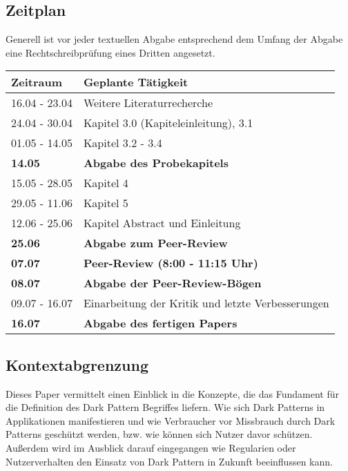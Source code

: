 \documentclass[conference,compsoc,final,a4paper]{IEEEtran}
\begin{document}
\subsection{Zeitplan}
Generell ist vor jeder textuellen Abgabe entsprechend dem Umfang der Abgabe eine Rechtschreibprüfung eines Dritten angesetzt.
\begin{table}[H]
\begin{tabular*}{\linewidth}{ @{\extracolsep{\fill}}l  l}
    \toprule
\textbf{Zeitraum}                   & \textbf{Geplante Tätigkeit}       \\
    \midrule
16.04 - 23.04                       & Weitere Literaturrecherche        \\
24.04 - 30.04                       & Kapitel 3.0 (Kapiteleinleitung), 3.1                          \\
01.05 - 14.05                       & Kapitel 3.2 - 3.4                          \\
\textbf{14.05}                      & \textbf{Abgabe des Probekapitels} \\
15.05 - 28.05                       & Kapitel 4                           \\
29.05 - 11.06                       & Kapitel 5                          \\
12.06 - 25.06                       & Kapitel Abstract und Einleitung                          \\
\textbf{25.06}                      & \textbf{Abgabe zum Peer-Review}   \\
\textbf{07.07}                      & \textbf{Peer-Review (8:00 - 11:15 Uhr)} \\
\textbf{08.07}                      & \textbf{Abgabe der Peer-Review-Bögen}   \\
09.07 - 16.07                       & Einarbeitung der Kritik und letzte Verbesserungen                           \\
\textbf{16.07}                      & \textbf{Abgabe des fertigen Papers}      \\
    \bottomrule
\end{tabular*}
\end{table}

\subsection{Kontextabgrenzung}
Dieses Paper vermittelt einen Einblick in die Konzepte, die das Fundament für die Definition des Dark Pattern Begriffes liefern. Wie sich Dark Patterns in Applikationen manifestieren und wie Verbraucher vor Missbrauch durch Dark Patterns geschützt werden, bzw. wie können sich Nutzer davor schützen. Außerdem wird im Ausblick darauf eingegangen wie Regularien oder Nutzerverhalten den Einsatz von Dark Pattern in Zukunft beeinflussen kann.
\end{document}

